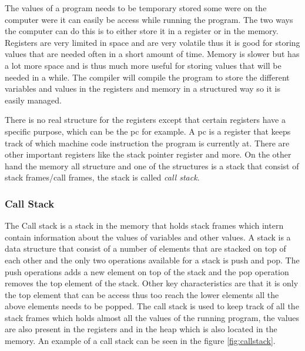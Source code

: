  

The values of a program needs to be temporary stored some were on the computer were it can easily be access while running the program.
The two ways the computer can do this is to either store it in a register or in the memory.
Registers are very limited in space and are very volatile thus it is good for storing values that are needed often in a short amount of time.
Memory is slower but has a lot more space and is thus much more useful for storing values that will be needed in a while.
The compiler will compile the program to store the different variables and values in the registers and memory in a structured way so it is easily managed.

There is no real structure for the registers except that certain registers have a specific purpose, which can be the \gls{pc} for example.
A \gls{pc} is a register that keeps track of which machine code instruction the program is currently at.
There are other important registers like the stack pointer register and more.
On the other hand the memory all structure and one of the structures is a stack that consist of stack frames/call frames, the stack is called \emph{call stack}.


\subsubsection{Call Stack}
The Call stack is a stack in the memory that holds stack frames which intern contain information about the values of variables and other values.
A stack is a data structure that consist of a number of elements that are stacked on top of each other and the only two operations available for a stack is push and pop.
The push operations adds a new element on top of the stack and the pop operation removes the top element of the stack.
Other key characteristics are that it is only the top element that can be access thus too reach the lower elements all the above elements needs to be popped.
The call stack is used to keep track of all the stack frames which holds almost all the values of the running program, the values are also present in the registers and in the heap which is also located in the memory.
An example of a call stack can be seen in the figure \ref{fig:callstack}.


